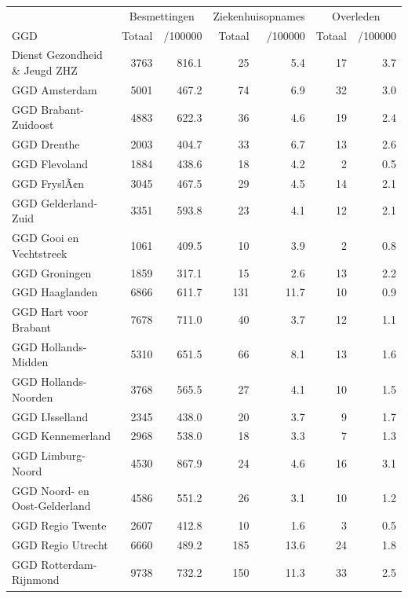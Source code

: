 \documentclass[
  english,
  man,floatsintext]{apa6}
\begin{document}
\begin{table}
\centering\begingroup\fontsize{10}{12}\selectfont

\begin{threeparttable}
\begin{tabular}{lrrrrrr}
\toprule
\multicolumn{1}{c}{ } & \multicolumn{2}{c}{Besmettingen} & \multicolumn{2}{c}{Ziekenhuisopnames} & \multicolumn{2}{c}{Overleden} \\
\cmidrule(l{3pt}r{3pt}){2-3} \cmidrule(l{3pt}r{3pt}){4-5} \cmidrule(l{3pt}r{3pt}){6-7}
GGD & Totaal & /100000 & Totaal & /100000 & Totaal & /100000\\
\midrule
Dienst Gezondheid \& Jeugd ZHZ & 3763 & 816.1 & 25 & 5.4 & 17 & 3.7\\
GGD Amsterdam & 5001 & 467.2 & 74 & 6.9 & 32 & 3.0\\
GGD Brabant-Zuidoost & 4883 & 622.3 & 36 & 4.6 & 19 & 2.4\\
GGD Drenthe & 2003 & 404.7 & 33 & 6.7 & 13 & 2.6\\
GGD Flevoland & 1884 & 438.6 & 18 & 4.2 & 2 & 0.5\\
GGD FryslÃ¢n & 3045 & 467.5 & 29 & 4.5 & 14 & 2.1\\
GGD Gelderland-Zuid & 3351 & 593.8 & 23 & 4.1 & 12 & 2.1\\
GGD Gooi en Vechtstreek & 1061 & 409.5 & 10 & 3.9 & 2 & 0.8\\
GGD Groningen & 1859 & 317.1 & 15 & 2.6 & 13 & 2.2\\
GGD Haaglanden & 6866 & 611.7 & 131 & 11.7 & 10 & 0.9\\
GGD Hart voor Brabant & 7678 & 711.0 & 40 & 3.7 & 12 & 1.1\\
GGD Hollands-Midden & 5310 & 651.5 & 66 & 8.1 & 13 & 1.6\\
GGD Hollands-Noorden & 3768 & 565.5 & 27 & 4.1 & 10 & 1.5\\
GGD IJsselland & 2345 & 438.0 & 20 & 3.7 & 9 & 1.7\\
GGD Kennemerland & 2968 & 538.0 & 18 & 3.3 & 7 & 1.3\\
GGD Limburg-Noord & 4530 & 867.9 & 24 & 4.6 & 16 & 3.1\\
GGD Noord- en Oost-Gelderland & 4586 & 551.2 & 26 & 3.1 & 10 & 1.2\\
GGD Regio Twente & 2607 & 412.8 & 10 & 1.6 & 3 & 0.5\\
GGD Regio Utrecht & 6660 & 489.2 & 185 & 13.6 & 24 & 1.8\\
GGD Rotterdam-Rijnmond & 9738 & 732.2 & 150 & 11.3 & 33 & 2.5\\

\end{tabular}
\end{threeparttable}
\end{table}
\end{document}
